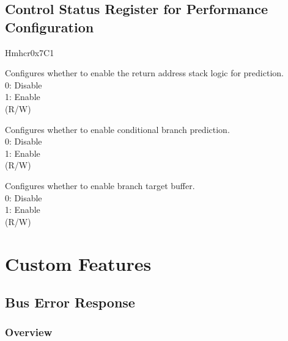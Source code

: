 \documentclass[main\_\_EN.tex]{subfiles}
\begin{document}
 \subsection{Control Status Register for Performance Configuration}
\label{sec:riscvcpu-perf-csr}
\begin{register}{H}{mhcr}{0x7C1}\label{regdesc:MHCR}
%
%
%
%
%
%
\regnewline%
\begin{regdesc}\begin{reglist}
\label{fielddesc:MHCRRS}\item [RS] Configures whether to enable the return address stack logic for prediction. \\
0: Disable \\
1: Enable \\
(R/W)
\label{fielddesc:MHCRBPE}\item [BPE] Configures whether to enable conditional branch prediction.\\
0: Disable \\
1: Enable \\
(R/W)
\label{fielddesc:MHCRBTB}\item [BTB] Configures whether to enable branch target buffer.\\
0: Disable \\
1: Enable \\
(R/W)
\end{reglist}\end{regdesc}
\end{register}
\newpage
\section{Custom Features}


\subsection{Bus Error Response}
\label{sec:riscvcpu-bus-err-resp}
\subsubsection{Overview}
\label{sec:riscvcpu-buserr-overview}
\end{document}
